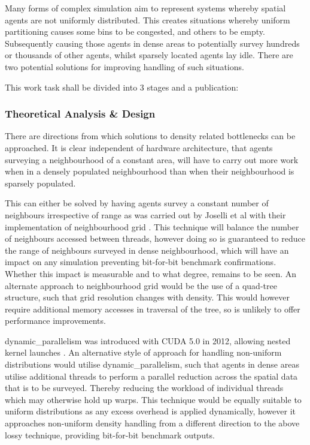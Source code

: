      Many forms of complex simulation aim to represent systems whereby spatial agents are not uniformly distributed. This creates situations whereby uniform partitioning causes some bins to be congested, and others to be empty. Subsequently causing those agents in dense areas to potentially survey hundreds or thousands of other agents, whilst sparsely located agents lay idle. There are two potential solutions for improving handling of such situations.
      
      This work task shall be divided into 3 stages and a publication:
      \subsubsection*{Theoretical Analysis \& Design}
        There are directions from which solutions to density related bottlenecks can be approached. It is clear independent of hardware architecture, that agents surveying a neighbourhood of a constant area, will have to carry out more work when in a densely populated neighbourhood than when their neighbourhood is sparsely populated. 
        
        This can either be solved by having agents survey a constant number of neighbours irrespective of range as was carried out by Joselli et al with their implementation of neighbourhood grid \cite{JR*15}. This technique will balance the number of neighbours accessed between threads, however doing so is guaranteed to reduce the range of neighbours surveyed in dense neighbourhood, which will have an impact on any simulation preventing bit-for-bit benchmark confirmations. Whether this impact is measurable and to what degree, remains to be seen. An alternate approach to neighbourhood grid would be the use of a quad-tree structure, such that grid resolution changes with density. This would however require additional memory accesses in traversal of the tree, so is unlikely to offer performance improvements.
        
        \Gls{dynamic_parallelism} was introduced with CUDA 5.0 in 2012, allowing nested kernel launches \cite{NV_DP}. An alternative style of approach for handling non-uniform distributions would utilise \gls{dynamic_parallelism}, such that agents in dense areas utilise additional threads to perform a parallel reduction across the spatial data that is to be surveyed. Thereby reducing the workload of individual threads which may otherwise hold up warps. This technique would be equally suitable to uniform distributions as any excess overhead is applied dynamically, however it approaches non-uniform density handling from a different direction to the above lossy technique, providing bit-for-bit benchmark outputs.
      
